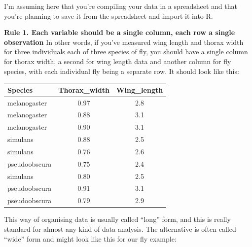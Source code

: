 \documentclass[
]{book}
\begin{document}
I'm assuming here that you're compiling your data in a spreadsheet and that you're planning to save it from the spreadsheet and import it into R.

\textbf{Rule 1. Each variable should be a single column, each row a single observation} In other words, if you've measured wing length and thorax width for three individuals each of three species of fly, you should have a single column for thorax width, a second for wing length data and another column for fly species, with each individual fly being a separate row. It should look like this:

\begin{longtable}[]{@{}lcc@{}}
\toprule
Species & Thorax\_width & Wing\_length\tabularnewline
\midrule
\endhead
melanogaster & 0.97 & 2.8\tabularnewline
melanogaster & 0.88 & 3.1\tabularnewline
melanogaster & 0.90 & 3.1\tabularnewline
simulans & 0.88 & 2.5\tabularnewline
simulans & 0.76 & 2.6\tabularnewline
pseudoobscura & 0.75 & 2.4\tabularnewline
simulans & 0.80 & 2.5\tabularnewline
pseudoobscura & 0.91 & 3.1\tabularnewline
pseudoobscura & 0.79 & 2.9\tabularnewline
\bottomrule
\end{longtable}

This way of organising data is usually called ``long'' form, and this is really standard for almost any kind of data analysis. The alternative is often called ``wide'' form and might look like this for our fly example:
\end{document}
